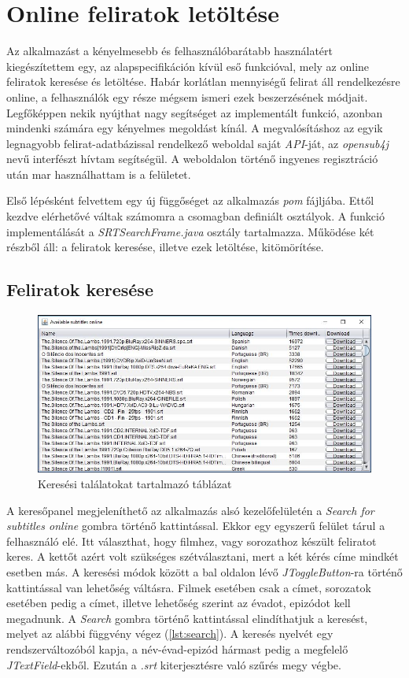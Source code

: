 \section{Online feliratok letöltése}

Az alkalmazást a kényelmesebb és felhasználóbarátabb használatért kiegészítettem egy, az alapspecifikáción kívül eső funkcióval, mely az online feliratok keresése és letöltése. Habár korlátlan mennyiségű felirat áll rendelkezésre online, a felhasználók egy része mégsem ismeri ezek beszerzésének módjait. Legfőképpen nekik nyújthat nagy segítséget az implementált funkció, azonban mindenki számára egy kényelmes megoldást kínál. A megvalósításhoz az egyik legnagyobb felirat-adatbázissal rendelkező weboldal saját \textit{API}-ját, az \textit{opensub4j} nevű interfészt hívtam segítségül. A weboldalon történő ingyenes regisztráció után mar használhattam is a felületet.

Első lépésként felvettem egy új függőséget az alkalmazás \textit{pom} fájljába. Ettől kezdve elérhetővé váltak számomra a csomagban definiált osztályok. A funkció implementálását a \textit{SRTSearchFrame.java} osztály tartalmazza. Működése két részből áll: a feliratok keresése, illetve ezek letöltése, kitömörítése.

\subsection{Feliratok keresése}

\begin{figure}[h!]
  \includegraphics[width=\linewidth]{images/online_search.jpg}
  \caption{Keresési találatokat tartalmazó táblázat}
  \label{fig:online_search}
\end{figure}

A keresőpanel megjeleníthető az alkalmazás alsó kezelőfelületén a \textit{Search for subtitles online} gombra történő kattintással. Ekkor egy egyszerű felület tárul a felhasználó elé. Itt választhat, hogy filmhez, vagy sorozathoz készült feliratot keres. A kettőt azért volt szükséges szétválasztani, mert a két kérés címe mindkét esetben más. A keresési módok között a bal oldalon lévő \textit{JToggleButton}-ra történő kattintással van lehetőség váltásra. Filmek esetében csak a címet, sorozatok esetében pedig a címet, illetve lehetőség szerint az évadot, epizódot kell megadnunk. A \textit{Search} gombra történő kattintással elindíthatjuk a keresést, melyet az alábbi függvény végez (\ref{lst:search}). A keresés nyelvét egy rendszerváltozóból kapja, a név-évad-epizód hármast pedig a megfelelő \textit{JTextField}-ekből. Ezután a \textit{.srt} kiterjesztésre való szűrés megy végbe. 

